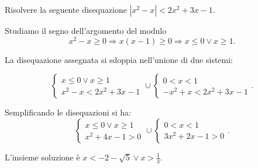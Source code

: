\begin{exrig}
\begin{esempio}
Risolvere la seguente disequazione $\left|x^2-x\right|<2x^2+3x-1$.

Studiamo il segno dell'argomento del modulo 
\[x^2-x\ge 0 \Rightarrow x(x-1)\ge 0 \Rightarrow x\le 0\vee x\ge 1.\]

La disequazione assegnata si sdoppia nell'unione di due sistemi:

\[\left\{\begin{array}{l}{x\le 0\vee x\ge 1}\\{x^2-x<2x^2+3x-1}\end{array}\right.\cup \left\{\begin{array}{l}{0<x<1}\\{-x^2+x<2x^2+3x-1}\end{array}\right..\]

 Semplificando le disequazioni si ha:
\begin{equation*}
\left\{\begin{array}{l}{x\le 0\vee x\ge 1}\\{x^2+4x-1>0}\end{array}\right.\cup \left\{\begin{array}{l}{0<x<1}\\{3x^2+2x-1>0}\end{array}\right..
\end{equation*}
\begin{center}

\end{center}

L'insieme soluzione è $x<-2-\sqrt 5\vee x>\frac 1 3$.
\end{esempio}
\end{exrig}

